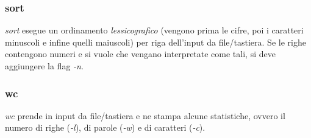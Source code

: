 \subsubsection{sort}
\textit{sort} esegue un ordinamento \textit{lessicografico} (vengono prima le cifre, poi i caratteri minuscoli e infine quelli maiuscoli) per riga dell'input da file/tastiera. Se le righe contengono numeri e si vuole che vengano interpretate come tali, si deve aggiungere la flag \textit{-n}.

\subsubsection{wc}
\textit{wc} prende in input da file/tastiera e ne stampa alcune statistiche, ovvero il numero di righe (\textit{-l}), di parole (\textit{-w}) e di caratteri (\textit{-c}).